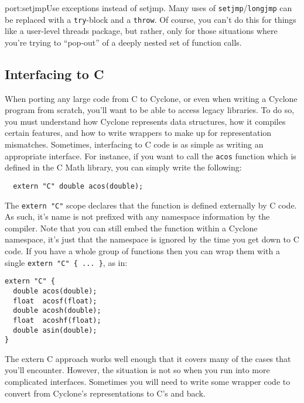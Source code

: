 \begin{porta}{port:setjmp}{Use exceptions instead of setjmp.}
Many uses of \texttt{setjmp}/\texttt{longjmp} can be replaced
with a \texttt{try}-block and a \texttt{throw}.  Of course,
you can't do this for things like a user-level threads package,
but rather, only for those situations where you're trying
to ``pop-out'' of a deeply nested set of function calls.
\end{porta}

\subsection{Interfacing to C}
When porting any large code from C to Cyclone, or even when writing
a Cyclone program from scratch, you'll want to be able to access
legacy libraries.  To do so, you must understand how Cyclone
represents data structures, how it compiles certain features,
and how to write wrappers to make up for representation mismatches.
Sometimes, interfacing to C code is as simple as writing
an appropriate interface.  For instance, if you want to
call the \texttt{acos} function which is defined in the C
Math library, you can simply write the following:
\begin{verbatim}
  extern "C" double acos(double);
\end{verbatim}

The \texttt{extern "C"} scope declares that the function is
defined externally by C code.  As such, it's name is not
prefixed with any namespace information by the compiler.
Note that you can still embed the function within a Cyclone
namespace, it's just that the namespace is ignored by the
time you get down to C code.  
If you have a whole group of functions then you can wrap them with
a single \texttt{extern "C" \{ ... \}}, as in:
\begin{verbatim}
extern "C" {
  double acos(double);
  float  acosf(float);
  double acosh(double);
  float  acoshf(float);
  double asin(double);
}
\end{verbatim}

The extern C approach works well enough that it covers many
of the cases that you'll encounter.  However, the situation is
not so when you run into more complicated interfaces.  Sometimes
you will need to write some wrapper code to convert from 
Cyclone's representations to C's and back.  

